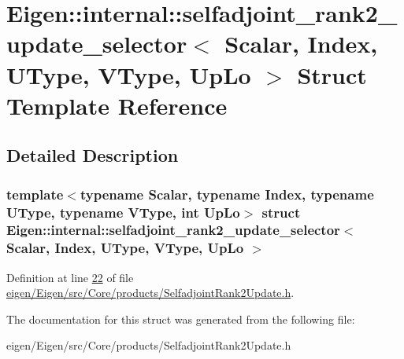 \hypertarget{struct_eigen_1_1internal_1_1selfadjoint__rank2__update__selector}{}\section{Eigen\+:\+:internal\+:\+:selfadjoint\+\_\+rank2\+\_\+update\+\_\+selector$<$ Scalar, Index, U\+Type, V\+Type, Up\+Lo $>$ Struct Template Reference}
\label{struct_eigen_1_1internal_1_1selfadjoint__rank2__update__selector}


\subsection{Detailed Description}
\subsubsection*{template$<$typename Scalar, typename Index, typename U\+Type, typename V\+Type, int Up\+Lo$>$\newline
struct Eigen\+::internal\+::selfadjoint\+\_\+rank2\+\_\+update\+\_\+selector$<$ Scalar, Index, U\+Type, V\+Type, Up\+Lo $>$}



Definition at line \hyperlink{eigen_2_eigen_2src_2_core_2products_2_selfadjoint_rank2_update_8h_source_l00022}{22} of file \hyperlink{eigen_2_eigen_2src_2_core_2products_2_selfadjoint_rank2_update_8h_source}{eigen/\+Eigen/src/\+Core/products/\+Selfadjoint\+Rank2\+Update.\+h}.



The documentation for this struct was generated from the following file\+:\begin{DoxyCompactItemize}
\item 
eigen/\+Eigen/src/\+Core/products/\+Selfadjoint\+Rank2\+Update.\+h\end{DoxyCompactItemize}
